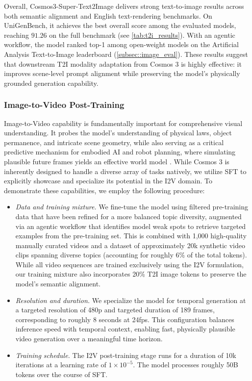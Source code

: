 \documentclass{llmxive}
\begin{document}
Overall, Cosmos3-Super-Text2Image delivers strong text-to-image results across both semantic alignment and English text-rendering benchmarks. On UniGenBench, it achieves the best overall score among the evaluated models, reaching $91.26$ on the full benchmark (see \cref{tab:t2i_results}). With an agentic workflow, the model ranked top-1 among open-weight models on the Artificial Analysis Text-to-Image leaderboard (\cref{subsec::image_eval}). These results suggest that downstream T2I modality adaptation from Cosmos 3 is highly effective: it improves scene-level prompt alignment while preserving the model's physically grounded generation capability.


\subsubsection{Image-to-Video Post-Training}
\label{sec::i2v_post_train}

Image-to-Video capability is fundamentally important for comprehensive visual understanding. It probes the model's understanding of physical laws, object permanence, and intricate scene geometry, while also serving as a critical predictive mechanism for embodied AI and robot planning, where simulating plausible future frames yields an effective world model \citep{wiedemer2025video, chen2025largevideoplanner}. While Cosmos 3 is inherently designed to handle a diverse array of tasks natively, we utilize SFT to explicitly showcase and specialize its potential in the I2V domain. To demonstrate these capabilities, we employ the following procedure:

\begin{itemize}
    \item \textit{Data and training mixture.} We fine-tune the model using filtered pre-training data that have been refined for a more balanced topic diversity, augmented via an agentic workflow that identifies model weak spots to retrieve targeted examples from the pre-training set. This is combined with 1,000 high-quality manually curated videos and a dataset of approximately 20k synthetic video clips spanning diverse topics (accounting for roughly 6\% of the total tokens). While all video sequences are trained exclusively using the I2V formulation, our training mixture also incorporates 20\% T2I image tokens to preserve the model's semantic alignment.

    \item \textit{Resolution and duration.} We specialize the model for temporal generation at a targeted resolution of 480p and targeted duration of 189 frames, corresponding to roughly 8 seconds at 24fps. This configuration balances inference speed with temporal context, enabling fast, physically plausible video generation over a meaningful time horizon.

    \item \textit{Training schedule.} The I2V post-training stage runs for a duration of 10k iterations at a learning rate of $1\times10^{-5}$. The model processes roughly 50B tokens over the course of SFT.
\end{itemize}
\end{document}
